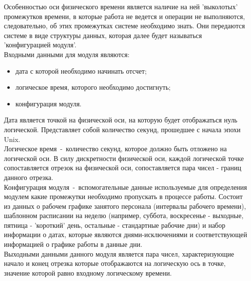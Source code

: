 Особенностью оси физического времени является наличие на ней 'выколотых' промежутков времени, в которые работа не ведется и операции не выполняются, следовательно, об этих промежутках системе необходимо знать.
Они передаются системе в виде структуры данных, которая далее будет называться 'конфигурацией модуля'.\\
\indent Входными данными для модуля являются:

\begin{itemize}
	\item дата с которой необходимо начинать отсчет;
	\item логическое время, которого необходимо достигнуть;
	\item конфигурация модуля.
\end{itemize}

\indent Дата является точкой на физической оси, на которую будет отображаться нуль логической. Представляет собой количество секунд, прошедшее с начала эпохи Unix.\\
\indent Логическое время~-~количество секунд, которое должно быть отложено на логической оси. В силу дискретности физической оси, каждой логической точке сопоставляется отрезок на физической оси, сопоставляется пара чисел - границ данного отрезка.\\
\indent Конфигурация модуля~-~вспомогательные данные используемые для определения модулем какие промежутки необходимо пропускать в процессе работы.
Состоит из данных о рабочем графике занятого персонала (интервалы рабочего времени), шаблонном расписании на неделю (например, суббота, воскресенье - выходные, пятница - 'короткий' день, остальные - стандартные рабочие дни) и набор информации о датах, которые являются днями-исключениями и соответствующей информацией о графике работы в данные дни.\\
\indent Выходными данными данного модуля является пара чисел, характеризующие начало и конец отрезка которые отображаются на логическую ось в точке, значение которой равно входному логическому времени.\\

